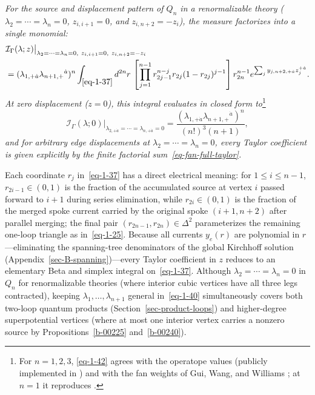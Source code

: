 \documentclass[11pt]{article}
\numberwithin{equation}{section}
\numberwithin{figure}{section}
\numberwithin{table}{section}
\begin{document}
\emph{For the source and displacement pattern of $Q_n$ in a renormalizable theory ($\lambda_2=\cdots=\lambda_n=0$, $z_{i,i+1}=0$, and $z_{i,n+2}=-z_i$), the measure factorizes into a single monomial:}
\begin{equation}\label{eq-1-41}
\begin{aligned}
&\mathcal I_\Gamma(\lambda;z)
\big|_{\lambda_2=\cdots=\lambda_n=0,
\ z_{i,i+1}=0,\ z_{i,n+2}=-z_i}\\
&=(\lambda_{1,+\dot a}\lambda_{n+1,+}{}^{\dot a})^n
\int_{\eqref{eq-1-37}}d^{2n}r\,
\left[\prod_{j=1}^{n-1}r_{2j-1}^{n-j}r_{2j}(1-r_{2j})^{j-1}\right]
r_{2n}^{n-1}
e^{\sum_j y_{j,n+2,+\dot a}z_j^{+\dot a}}.
\end{aligned}
\end{equation}
\emph{At zero displacement ($z=0$), this integral evaluates in closed form to}\footnote{For $n=1,2,3$, \eqref{eq-1-42} agrees with the operatope values \cite[Equations (4.20), (4.44), (4.67)]{operatope} (publicly implemented in \cite{LamanLoopstrap}) and with the fan weights of Gui, Wang, and Williams \cite[Sections 4.4--4.6]{GWW}; at $n=1$ it reproduces \cite[Equation (2.48)]{BK}.}
\begin{equation}\label{eq-1-42}
\left.\mathcal I_\Gamma(\lambda;0)\right|_{\lambda_{2,+\dot a}=\cdots=\lambda_{n,+\dot a}=0}
=\frac{(\lambda_{1,+\dot a}\lambda_{n+1,+}{}^{\dot a})^n}{(n!)^3(n+1)},
\end{equation}
\emph{and for arbitrary edge displacements at $\lambda_2=\cdots=\lambda_n=0$, every Taylor coefficient is given explicitly by the finite factorial sum~\eqref{eq-fan-full-taylor}.}

Each coordinate $r_j$ in~\eqref{eq-1-37} has a direct electrical meaning: for $1\le i\le n-1$, $r_{2i-1}\in(0,1)$ is the fraction of the accumulated source at vertex $i$ passed forward to $i+1$ during series elimination, while $r_{2i}\in(0,1)$ is the fraction of the merged spoke current carried by the original spoke $(i+1,n+2)$ after parallel merging; the final pair $(r_{2n-1},r_{2n})\in\Delta^2$ parameterizes the remaining one-loop triangle as in~\eqref{eq-1-25}. Because all currents $y_e(r)$ are polynomial in $r$---eliminating the spanning-tree denominators of the global Kirchhoff solution (Appendix~\ref{sec-B-spanning})---every Taylor coefficient in $z$ reduces to an elementary Beta and simplex integral on~\eqref{eq-1-37}. Although $\lambda_2=\cdots=\lambda_n=0$ in $Q_n$ for renormalizable theories (where interior cubic vertices have all three legs contracted), keeping $\lambda_1,\ldots,\lambda_{n+1}$ general in~\eqref{eq-1-40} simultaneously covers both two-loop quantum products (Section~\ref{sec-product-loops}) and higher-degree superpotential vertices (where at most one interior vertex carries a nonzero source by Propositions~\ref{b-00225} and~\ref{b-00240}).
\end{document}
